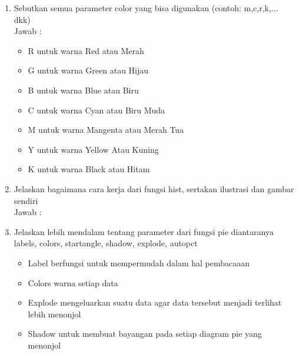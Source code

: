 \begin{enumerate}
\item Sebutkan semua parameter color yang bisa digunakan (contoh: m,c,r,k,... dkk)\\
Jawab :
\begin{itemize}
\item R untuk warna Red atau Merah
\item G untuk warna Green atau Hijau
\item B untuk warna Blue atau Biru
\item C untuk warna Cyan atau Biru Muda
\item M untuk warna Mangenta atau Merah Tua
\item Y untuk warna Yellow Atau Kuning
\item K untuk warna Black atau Hitam
\end{itemize}

\item Jelaskan bagaimana cara kerja dari fungsi hist, sertakan ilustrasi dan gambar sendiri\\
Jawab :


\item Jelaskan lebih mendalam tentang parameter dari fungsi pie diantaranya labels, colors, startangle, shadow, explode, autopct\\
\begin{itemize}
\item Label berfungsi untuk mempermudah dalam hal pembacaaan
\item Colors warna setiap data
\item Explode mengeluarkan suatu data agar data tersebut menjadi terlihat lebih menonjol
\item Shadow untuk membuat bayangan pada setiap diagram pie yang menonjol
\end{itemize}
\end{enumerate}
